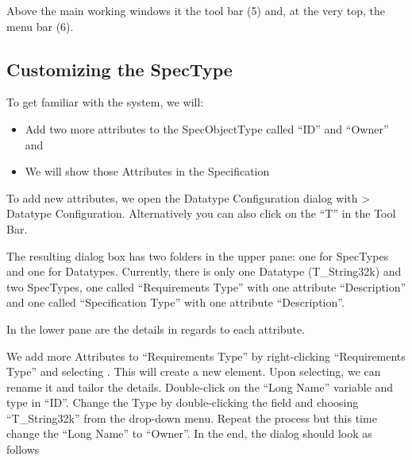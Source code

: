 Above the main working windows it the tool bar (5) and, at the very top, the menu bar (6).

\subsection{Customizing the SpecType}

To get familiar with the system, we will:

\begin{itemize}

\item
  Add two more attributes to the SpecObjectType called ``ID'' and ``Owner'' and
\item
  We will show those Attributes in the Specification
\end{itemize}

To add new attributes, we open the Datatype Configuration dialog with \pror{} \textgreater{} Datatype Configuration.  Alternatively you can also click on the ``T'' in the Tool Bar.

The resulting dialog box has two folders in the upper pane: one for SpecTypes and one for Datatypes.  Currently, there is only one Datatype (T\_String32k) and two SpecTypes, one called ``Requirements Type'' with one attribute ``Description'' and one called ``Specification Type'' with one attribute ``Description''.

In the lower pane are the details in regards to each attribute.

We add more Attributes to ``Requirements Type'' by right-clicking ``Requirements Type'' and selecting .  This will create a new element.  Upon selecting, we can rename it and tailor the details.  Double-click on the ``Long Name'' variable and type in ``ID''.  Change the Type by double-clicking the field and choosing ``T\_String32k'' from the drop-down menu.  Repeat the process but this time change the ``Long Name'' to ``Owner''.  In the end, the dialog should look as follows

